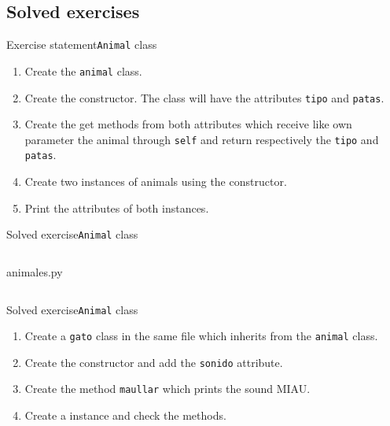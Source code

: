 \documentclass[10pt,compress]{beamer} %
\begin{document}
\subsection{Solved exercises}

\begin{frame}{Exercise statement}{\texttt{Animal} class}
	\begin{enumerate}
		\item Create the \texttt{animal} class. 
		\item Create the constructor. The class will have the attributes \texttt{tipo} and \texttt{patas}.
		\item Create the get methods from both attributes which receive like own parameter the animal through \texttt{self} and return respectively the \texttt{tipo} and \texttt{patas}. 
		\item Create two instances of animals using the constructor.
		\item Print the attributes of both instances.
	\end{enumerate}	
\end{frame}

\begin{frame}{Solved exercise}{\texttt{Animal} class}
	\vspace{-0.2cm}
    \begin{columns}
			\begin{block}{animales.py}
			\vspace{-0.3cm} 
			\vspace{-0.3cm} 
			\end{block}
	\end{columns}
\end{frame}

\begin{frame}{Solved exercise}{\texttt{Animal} class}
	\begin{enumerate}
		\item Create a \texttt{gato} class in the same file which inherits from the \texttt{animal} class. 
		\item Create the constructor and add the \texttt{sonido} attribute. 
		\item Create the method \texttt{maullar} which prints the sound MIAU. 
		\item Create a instance and check the methods.
	\end{enumerate}	
\end{frame}
\end{document}
